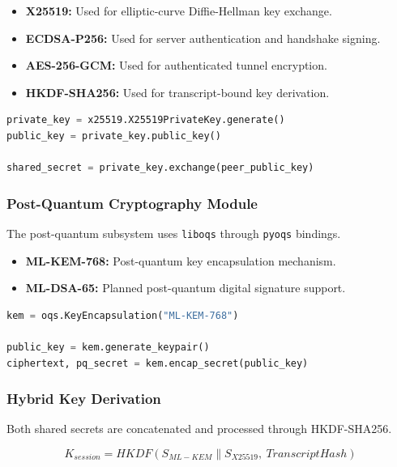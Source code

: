 \begin{itemize}
    \item \textbf{X25519:} Used for elliptic-curve Diffie-Hellman key exchange.
    \item \textbf{ECDSA-P256:} Used for server authentication and handshake signing.
    \item \textbf{AES-256-GCM:} Used for authenticated tunnel encryption.
    \item \textbf{HKDF-SHA256:} Used for transcript-bound key derivation.
\end{itemize}

\begin{lstlisting}[language=Python, caption={Classical Key Exchange Initialization}]
private_key = x25519.X25519PrivateKey.generate()
public_key = private_key.public_key()

shared_secret = private_key.exchange(peer_public_key)
\end{lstlisting}

\subsubsection{Post-Quantum Cryptography Module}

The post-quantum subsystem uses \texttt{liboqs} through \texttt{pyoqs} bindings.

\begin{itemize}
    \item \textbf{ML-KEM-768:} Post-quantum key encapsulation mechanism.
    \item \textbf{ML-DSA-65:} Planned post-quantum digital signature support.
\end{itemize}

\begin{lstlisting}[language=Python, caption={ML-KEM-768 Key Encapsulation}]
kem = oqs.KeyEncapsulation("ML-KEM-768")

public_key = kem.generate_keypair()
ciphertext, pq_secret = kem.encap_secret(public_key)
\end{lstlisting}

\subsubsection{Hybrid Key Derivation}

Both shared secrets are concatenated and processed through HKDF-SHA256.

\begin{equation}
K_{session} = HKDF(S_{ML-KEM} \parallel S_{X25519},\ TranscriptHash)
\end{equation}

